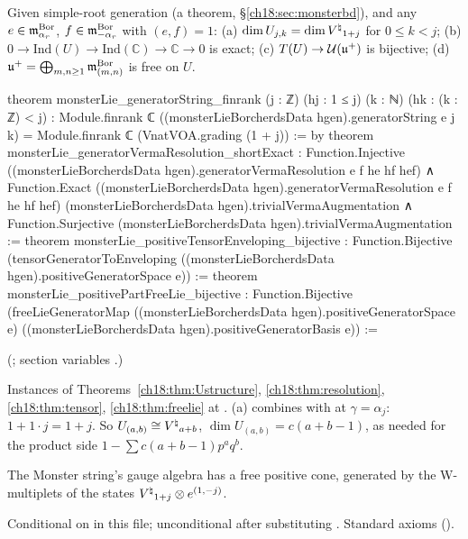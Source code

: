 \begin{theorem}\label{ch18:thm:monsterstructure}
Given simple-root generation (a theorem, \S\ref{ch18:sec:monsterbd}), and any $e\in\mathfrak{m}^{\mathrm{Bor}}_{\alpha_r}$, $f\in\mathfrak{m}^{\mathrm{Bor}}_{-\alpha_r}$ with $(e,f)=1$:
(a) $\dim U_{j,k}=\dim{V^{\natural}}_{1+j}$ for $0\le k<j$; (b) $0\to \mathrm{Ind}(U)\to \mathrm{Ind}(\mathbb C)\to\mathbb C\to0$ is exact; (c) $T(U)\to \mathcal U(\mathfrak{u}^+)$ is bijective;
(d) $\mathfrak{u}^+=\bigoplus_{m,n\ge1}\mathfrak{m}^{\mathrm{Bor}}_{(m,n)}$ is free on $U$.
\end{theorem}
\begin{leancode}
theorem monsterLie_generatorString_finrank (j : ℤ) (hj : 1 ≤ j) (k : ℕ) (hk : (k : ℤ) < j) :
    Module.finrank ℂ ((monsterLieBorcherdsData hgen).generatorString e j k) =
      Module.finrank ℂ (VnatVOA.grading (1 + j)) := by
theorem monsterLie_generatorVermaResolution_shortExact :
    Function.Injective ((monsterLieBorcherdsData hgen).generatorVermaResolution e f he hf hef) ∧
      Function.Exact ((monsterLieBorcherdsData hgen).generatorVermaResolution e f he hf hef)
        (monsterLieBorcherdsData hgen).trivialVermaAugmentation ∧
      Function.Surjective (monsterLieBorcherdsData hgen).trivialVermaAugmentation :=
theorem monsterLie_positiveTensorEnveloping_bijective :
    Function.Bijective (tensorGeneratorToEnveloping
      ((monsterLieBorcherdsData hgen).positiveGeneratorSpace e)) :=
theorem monsterLie_positivePartFreeLie_bijective :
    Function.Bijective (freeLieGeneratorMap
      ((monsterLieBorcherdsData hgen).positiveGeneratorSpace e)
      ((monsterLieBorcherdsData hgen).positiveGeneratorBasis e)) :=
\end{leancode}
(; section variables
.)
\begin{dictionary}
Instances of Theorems~\ref{ch18:thm:Ustructure}, \ref{ch18:thm:resolution}, \ref{ch18:thm:tensor}, \ref{ch18:thm:freelie} at
.  (a) combines  with  at $\gamma=\alpha_j$:
$1+1\cdot j=1+j$.  So $U_{(a,b)}\cong{V^{\natural}}_{a+b}$, $\dim U_{(a,b)}=c(a+b-1)$, as needed for the product side $1-\sum c(a+b-1)p^aq^b$.
\end{dictionary}
\begin{physics}The Monster string's gauge algebra has a free positive cone, generated by the W-multiplets of the states ${V^{\natural}}_{1+j}\otimes e^{(1,-j)}$.\end{physics}
\begin{status}
Conditional on  in this file; unconditional after substituting .  Standard axioms
().
\end{status}

